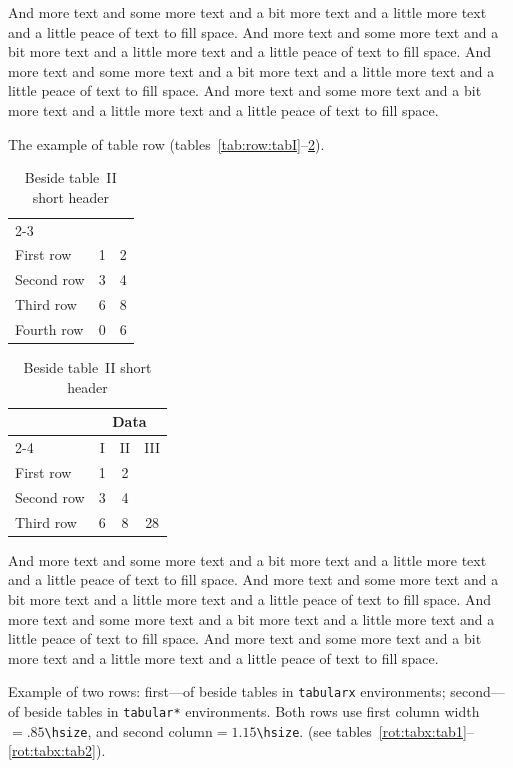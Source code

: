 \documentclass{book}
\newcommand\TABULARI{\begin{tabular}{|l|>{\phantom0}c|>{\phantom0}c|}
  \hline
  \raisebox{-1.5ex}{Column Head}
               & \multicolumn{2}{c|}{Data} \\
               \cline{2-3}
               & \multicolumn{1}{c|}{I}
                           & \multicolumn{1}{c|}{II}
  \\\hline
  First row    &         1 &         2 \\
  Second row   &         3 &         4 \\
  Third row    &         6 &         8 \\
  Fourth row   & \llap{1}0 & \llap{1}6 \\
  \hline
\end{tabular}}
\newcommand\TABULARII{\begin{tabular}{|l|c|c|c|}
  \hline
  \raisebox{-1.5ex}{Column Head}
               & \multicolumn{3}{c|}{Data} \\
               \cline{2-4}
               & I      & II      & III        \\
  \hline
  First row    & 1      & 2       & \phantom01 \\
  Second row   & 3      & 4       & \phantom06 \\
  Third row    & 6      & 8       &         28 \\
  \hline
\end{tabular}}
\providecommand*{\env}[1]{\texttt{#1}}
\def\text{And more text and some more text and a bit more text and
a little more text and a little peace of text to fill space}
\def\Text{{\mdseries \text. \text. \text.  \text. }}
\begin{document}
\Text

\fi

\clearpage
The example of table row (tables~\ref{tab:row:tabI}--\ref{tab:row:tabII}).

\begin{table}
\begin{floatrow}
\ttabbox
{\caption[Beside table~I long header]%
 {Beside table~I with long long long top aligned header}\label{tab:row:tabI}}
{\TABULARI}
%
\ttabbox
{\caption{Beside table~II short header}\label{tab:row:tabII}}
{\TABULARII}
\end{floatrow}
\end{table}

\Text

\clearpage
Example of two rows: first---of beside tables in \env{tabularx} environments;
second---of beside tables in \env{tabular*} environments. Both rows use first column width${}=.85$\verb|\hsize|,
and second column${}=1.15$\verb|\hsize|.
(see tables~\ref{rot:tabx:tab1}--\ref{rot:tabx:tab2}).
\end{document}
